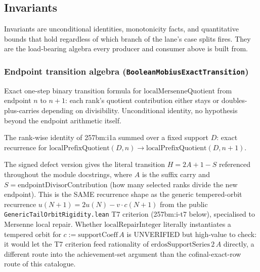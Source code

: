 \subsection{Invariants}

Invariants are unconditional identities, monotonicity facts, and quantitative bounds that hold
regardless of which branch of the lane's case splits fires. They are the load-bearing algebra
every producer and consumer above is built from.

\subsubsection*{Endpoint transition algebra (\texttt{BooleanMobiusExactTransition})}

\begin{thm}
Exact one-step binary transition formula for $\mathrm{localMersenneQuotient}$ from endpoint $n$
to $n+1$: each rank's quotient contribution either stays or doubles-plus-carries depending on
divisibility. Unconditional identity, no hypothesis beyond the endpoint arithmetic itself.
\par\noindent{}   
\end{thm}

\begin{thm}
The rank-wise identity of 257bm:i1a summed over a fixed support $D$: exact recurrence for
$\mathrm{localPrefixQuotient}(D,n)\to\mathrm{localPrefixQuotient}(D,n+1)$.
\par\noindent{}   
\end{thm}

\begin{thm}[257bm:i1c --- \texttt{localEndpointDefect\_succ}, the $H=2A+1-S$ recurrence]
The signed defect version gives the literal transition $H = 2A+1-S$ referenced throughout the
module docstrings, where $A$ is the suffix carry and $S=\mathrm{endpointDivisorContribution}$
(how many selected ranks divide the new endpoint). This is the SAME recurrence shape as the
generic tempered-orbit recurrence $u(N+1)=2u(N)-v\cdot c(N+1)$ from the public
\texttt{GenericTailOrbitRigidity.lean} T7 criterion (257bm:i-t7 below), specialised to Mersenne
local repair. Whether $\mathrm{localRepairInteger}$ literally instantiates a tempered orbit for
$c:=\mathrm{supportCoeff}\,A$ is UNVERIFIED but high-value to check: it would let the T7
criterion feed rationality of $\mathrm{erdosSupportSeries}\,2\,A$ directly, a different route
into the achievement-set argument than the cofinal-exact-row route of this catalogue.
\par\noindent{}    
\end{thm}


